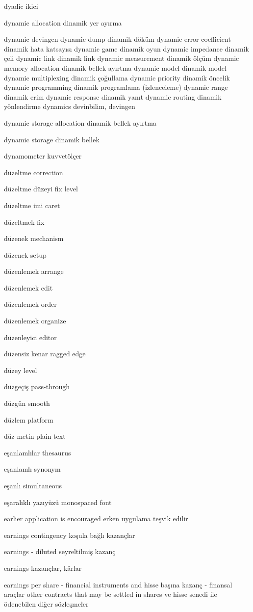 \documentclass[12pt,fleqn]{article}\usepackage{../../common}
\begin{document}
dyadic ikici

dynamic allocation dinamik yer ayırma

dynamic devingen
dynamic dump dinamik döküm
dynamic error coefficient dinamik hata katsayısı
dynamic game dinamik oyun
dynamic impedance dinamik çeli
dynamic link dinamik link
dynamic measurement dinamik ölçüm
dynamic memory allocation dinamik bellek ayırtma
dynamic model dinamik model
dynamic multiplexing dinamik çoğullama
dynamic priority dinamik öncelik
dynamic programming dinamik programlama (izlenceleme)
dynamic range dinamik erim
dynamic response dinamik yanıt
dynamic routing dinamik yönlendirme
dynamics devinbilim, devingen

dynamic storage allocation dinamik bellek ayırtma

dynamic storage dinamik bellek

dynamometer kuvvetölçer

düzeltme correction

düzeltme düzeyi fix level

düzeltme imi caret

düzeltmek fix

düzenek mechanism

düzenek setup

düzenlemek arrange

düzenlemek edit

düzenlemek order

düzenlemek organize

düzenleyici editor

düzensiz kenar ragged edge

düzey level

düzgeçiş pass-through

düzgün smooth

düzlem platform

düz metin plain text

eşanlamlılar thesaurus

eşanlamlı synonym

eşanlı simultaneous

eşaralıklı yazıyüzü monospaced font

earlier application is encouraged erken uygulama teşvik edilir

earnings contingency koşula bağlı kazançlar

earnings - diluted seyreltilmiş kazanç

earnings kazançlar, kârlar

earnings per share - financial instruments and hisse başına kazanç - finansal araçlar other contracts that may be settled in shares ve hisse senedi ile ödenebilen diğer sözleşmeler
\end{document}
